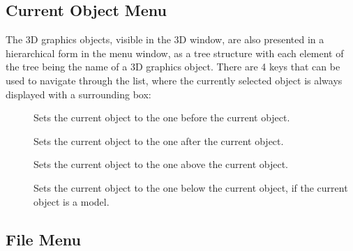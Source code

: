 \subsection{Current Object Menu}

The 3D graphics objects, visible in the 3D window, are also presented
in a hierarchical form in the menu window, as a tree structure with
each element of the tree being the name of a 3D graphics object.
There are 4 keys that can be used to navigate through the list, where
the currently selected object is always displayed with a surrounding
box:

\begin{description}
\item[]  Sets the current object to the one before
                the current object.
\item[]  Sets the current object to the one after
                the current object.
\item[]  Sets the current object to the one above
                the current object.
\item[]  Sets the current object to the one below
                the current object, if the current object is a model.
\end{description}

\subsection{File Menu}

